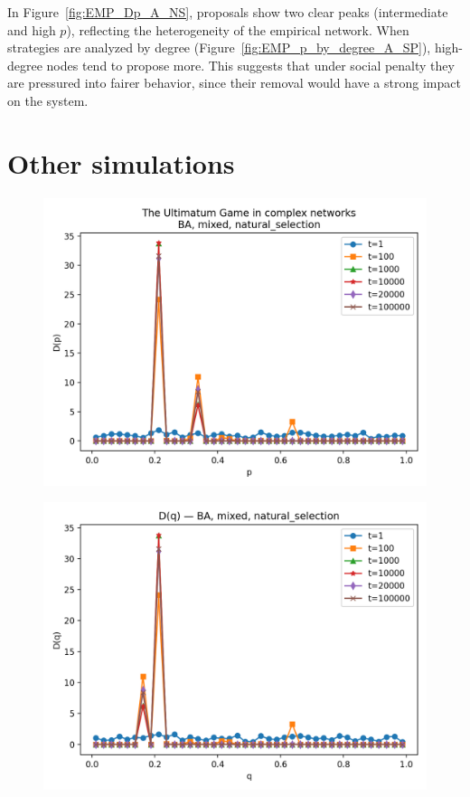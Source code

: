 \noindent In Figure~\ref{fig:EMP_Dp_A_NS}, proposals show two clear peaks (intermediate
and high $p$), reflecting the heterogeneity of the empirical network.  
When strategies are analyzed by degree (Figure~\ref{fig:EMP_p_by_degree_A_SP}),
high-degree nodes tend to propose more. This suggests that under social penalty
they are pressured into fairer behavior, since their removal would have a strong
impact on the system.

\section{Other simulations}

\begin{figure}[h!]
    \centering
    \setlength{\tabcolsep}{2pt}
    \begin{minipage}[t]{0.48\textwidth}
        \centering
        \includegraphics[width=\textwidth]{images/TASK1/Dp_BA_MIX_natural_selection.png}
        \label{fig:Mix_Dp}
    \end{minipage}
    \hfill
    \begin{minipage}[t]{0.48\textwidth}
        \centering
        \includegraphics[width=\textwidth]{images/TASK1/Dq_BA_MIX_natural_selection.png}

\end{minipage}
\end{figure}
